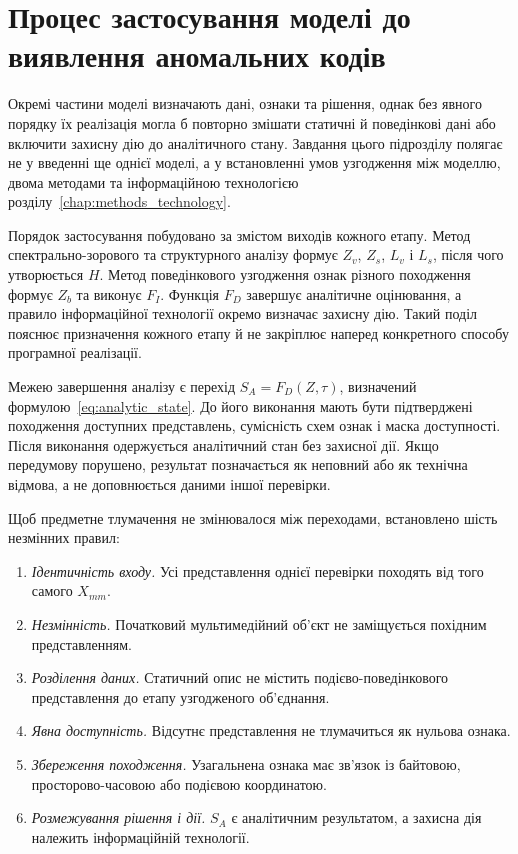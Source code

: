 \section{Процес застосування моделі до виявлення аномальних кодів}
\label{sec:detection_process_model}

Окремі частини моделі визначають дані, ознаки та рішення, однак без явного порядку їх реалізація могла б повторно змішати статичні й поведінкові дані або включити захисну дію до аналітичного стану. Завдання цього підрозділу полягає не у введенні ще однієї моделі, а у встановленні умов узгодження між моделлю, двома методами та інформаційною технологією розділу~\ref{chap:methods_technology}.

Порядок застосування побудовано за змістом виходів кожного етапу. Метод спектрально-зорового та структурного аналізу формує $Z_v$, $Z_s$, $L_v$ і $L_s$, після чого утворюється $H$. Метод поведінкового узгодження ознак різного походження формує $Z_b$ та виконує $F_I$. Функція $F_D$ завершує аналітичне оцінювання, а правило інформаційної технології окремо визначає захисну дію. Такий поділ пояснює призначення кожного етапу й не закріплює наперед конкретного способу програмної реалізації.

Межею завершення аналізу є перехід $S_A=F_D(Z,\tau)$, визначений формулою~\eqref{eq:analytic_state}. До його виконання мають бути підтверджені походження доступних представлень, сумісність схем ознак і маска доступності. Після виконання одержується аналітичний стан без захисної дії. Якщо передумову порушено, результат позначається як неповний або як технічна відмова, а не доповнюється даними іншої перевірки.

Щоб предметне тлумачення не змінювалося між переходами, встановлено шість незмінних правил:

\begin{enumerate}
\item \textit{Ідентичність входу.} Усі представлення однієї перевірки походять від того самого $X_{mm}$.
\item \textit{Незмінність.} Початковий мультимедійний об’єкт не заміщується похідним представленням.
\item \textit{Розділення даних.} Статичний опис не містить подієво-поведінкового представлення до етапу узгодженого об’єднання.
\item \textit{Явна доступність.} Відсутнє представлення не тлумачиться як нульова ознака.
\item \textit{Збереження походження.} Узагальнена ознака має зв’язок із байтовою, просторово-часовою або подієвою координатою.
\item \textit{Розмежування рішення і дії.} $S_A$ є аналітичним результатом, а захисна дія належить інформаційній технології.
\end{enumerate}

